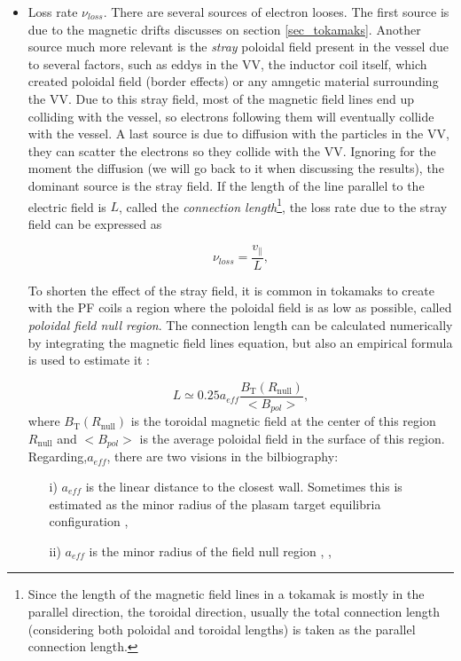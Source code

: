 \documentclass[a4paper,12pt,oneside]{book}
\begin{document}
\begin{itemize}
	\item Loss rate $\nu_{loss}$. There are several sources of electron looses. The first source is due to the magnetic drifts discusses on section \ref{sec_tokamaks}. Another source much more relevant is the \textit{stray} poloidal field present in the vessel due to several factors, such as eddys in the VV, the inductor coil itself, which created poloidal field (border effects) or any amngetic material surrounding the VV. Due to this stray field, most of the magnetic field lines end up colliding with the vessel, so electrons following them will eventually collide with the vessel. A last source is due to diffusion with the particles in the VV, they can scatter the electrons so they collide with the VV. Ignoring for the moment the diffusion (we will go back to it when discussing the results), the dominant source is the stray field. If the length of the line parallel to the electric field is $L$, called the \textit{connection length}\footnote{Since the length of the magnetic field lines in a tokamak is mostly in the parallel direction, the toroidal direction, usually the total connection length (considering both poloidal and toroidal lengths) is taken as the parallel connection length.}, the loss rate due to the stray field can be expressed as

	\begin{equation}\label{nu loss}
\nu_{loss} = \dfrac{v_{\parallel}}{L},
	\end{equation}

To shorten the effect of the stray field, it is common in tokamaks to create with the PF coils a region where the poloidal field is as low as possible, called \textit{poloidal field null region}. The connection length can be calculated numerically by integrating the magnetic field lines equation, but also an empirical formula is used to estimate it \cite{ITER_2007}:

	\begin{equation}\label{ec L}
L \simeq 0.25 a_{eff}\dfrac{B_\text{T}(R_{\text{null}})}{<B_{pol}>},
	\end{equation}
where $B_\text{T}(R_{\text{null}})$ is the toroidal magnetic field at the center of this region $R_{\text{null}}$ and $<B_{pol}>$ is the average poloidal field in the surface of this region. Regarding,$a_{eff}$, there are two visions in the bilbiography:

	\begin{itemize}
		\item[i)] $a_{eff}$ is the linear distance to the closest wall. Sometimes this is estimated as the minor radius of the plasam target equilibria configuration \cite{KimThesis}, \cite{Lloyd_1991}
		\item[ii)] $a_{eff}$ is the minor radius of the field null region \cite{TCV_thesis}, \cite{ITER_2007}, \cite{ITER_2019}
	\end{itemize}

\end{itemize}
\end{document}
